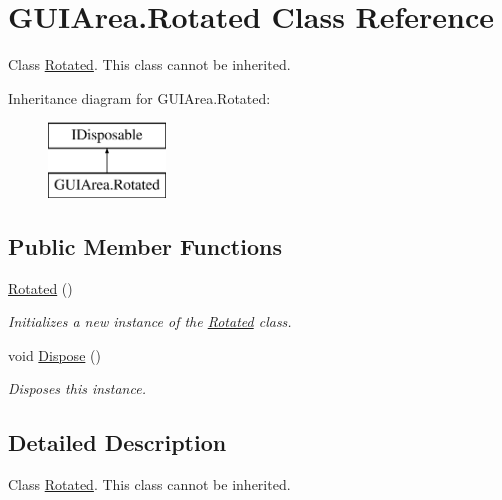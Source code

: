 \hypertarget{class_g_u_i_area_1_1_rotated}{}\section{G\+U\+I\+Area.\+Rotated Class Reference}
\label{class_g_u_i_area_1_1_rotated}


Class \hyperlink{class_g_u_i_area_1_1_rotated}{Rotated}. This class cannot be inherited.  


Inheritance diagram for G\+U\+I\+Area.\+Rotated\+:\begin{figure}[H]
\begin{center}
\leavevmode
\includegraphics[height=2.000000cm]{class_g_u_i_area_1_1_rotated}
\end{center}
\end{figure}
\subsection*{Public Member Functions}
\begin{DoxyCompactItemize}
\item 
\hyperlink{class_g_u_i_area_1_1_rotated_aef2a3cc9bd58adba4b23485f85a74f1f}{Rotated} ()
\begin{DoxyCompactList}\small\item\em Initializes a new instance of the \hyperlink{class_g_u_i_area_1_1_rotated}{Rotated} class. \end{DoxyCompactList}\item 
void \hyperlink{class_g_u_i_area_1_1_rotated_af137ea603de7ba13455a900b95670d2b}{Dispose} ()
\begin{DoxyCompactList}\small\item\em Disposes this instance. \end{DoxyCompactList}\end{DoxyCompactItemize}


\subsection{Detailed Description}
Class \hyperlink{class_g_u_i_area_1_1_rotated}{Rotated}. This class cannot be inherited. 



